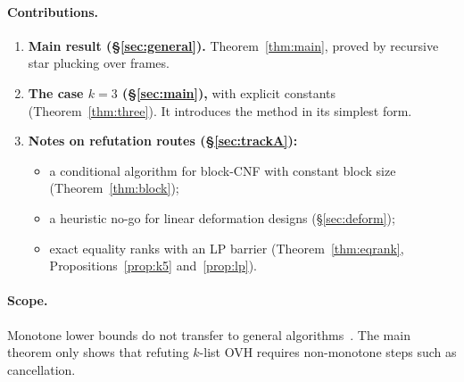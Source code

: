 \documentclass[11pt,a4paper]{article}
\theoremstyle{plain}
\theoremstyle{definition}
\theoremstyle{remark}
\begin{document}
\paragraph{Contributions.}
\begin{enumerate}[leftmargin=16pt]
  \item \textbf{Main result (\S\ref{sec:general}).} Theorem~\ref{thm:main}, proved by recursive star plucking over
    frames.
  \item \textbf{The case $k=3$ (\S\ref{sec:main}),} with explicit constants (Theorem~\ref{thm:three}). It introduces
    the method in its simplest form.
  \item \textbf{Notes on refutation routes (\S\ref{sec:trackA}):}
    \begin{itemize}[leftmargin=12pt]
      \item a conditional algorithm for block-CNF with constant block size (Theorem~\ref{thm:block});
      \item a heuristic no-go for linear deformation designs (\S\ref{sec:deform});
      \item exact equality ranks with an LP barrier (Theorem~\ref{thm:eqrank}, Propositions~\ref{prop:k5}
        and~\ref{prop:lp}).
    \end{itemize}
\end{enumerate}

\paragraph{Scope.} Monotone lower bounds do not transfer to general algorithms~\cite{Raz85b,Tar88}. The main theorem
only shows that refuting $k$-list OVH requires non-monotone steps such as cancellation.
\end{document}
